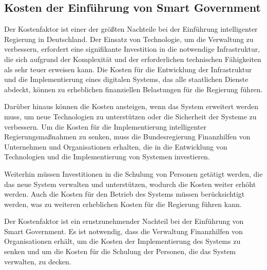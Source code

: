 \subsection{Kosten der Einführung von Smart Government}
Der Kostenfaktor ist einer der größten Nachteile bei der Einführung intelligenter Regierung in Deutschland. 
Der Einsatz von Technologie, um die Verwaltung zu verbessern, erfordert eine signifikante Investition in die notwendige Infrastruktur, die sich aufgrund der Komplexität und der erforderlichen technischen Fähigkeiten als sehr teuer erweisen kann. 
Die Kosten für die Entwicklung der Infrastruktur und die Implementierung eines digitalen Systems, das alle staatlichen Dienste abdeckt, können zu erheblichen finanziellen Belastungen für die Regierung führen.
\par
Darüber hinaus können die Kosten ansteigen, wenn das System erweitert werden muss, um neue Technologien zu unterstützen oder die Sicherheit der Systeme zu verbessern. 
Um die Kosten für die Implementierung intelligenter Regierungsmaßnahmen zu senken, muss die Bundesregierung Finanzhilfen von Unternehmen und Organisationen erhalten, die in die Entwicklung von Technologien und die Implementierung von Systemen investieren.
\par
Weiterhin müssen Investitionen in die Schulung von Personen getätigt werden, die das neue System verwalten und unterstützen, wodurch die Kosten weiter erhöht werden. 
Auch die Kosten für den Betrieb des Systems müssen berücksichtigt werden, was zu weiteren erheblichen Kosten für die Regierung führen kann.
\par
Der Kostenfaktor ist ein ernstzunehmender Nachteil bei der Einführung von Smart Government. 
Es ist notwendig, dass die Verwaltung Finanzhilfen von Organisationen erhält, um die Kosten der Implementierung des Systems zu senken und um die Kosten für die Schulung der Personen, die das System verwalten, zu decken.